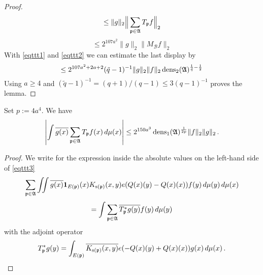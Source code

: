 {\begin{proof}
\begin{equation}
\end{equation}
 \begin{equation}
     \le \|g\|_2 \Big\| \sum_{\mathfrak p \in \mathfrak{A}} T_{\mathfrak p} f \Big\|_2
\end{equation}
 \begin{equation}
     \le 2^{107a^2}\|g\|_2 \|  M_{\mathcal{B}}f \|_2
\end{equation}
With \eqref{eqttt1} and
\eqref{eqttt2} we can estimate the last display by
\begin{equation}
    \le 2^{107a^2+2a+2}(\tilde{q}-1)^{-1} \|g\|_2 \|f\|_2\operatorname{\operatorname{dens}}_2(\mathfrak{A})^{\frac 1{\tilde{q}}-\frac 12}
\end{equation}
Using $a\ge 4$ and
$(\tilde q - 1)^{-1} = (q+1)/(q-1) \le 3(q-1)^{-1}$
proves the lemma.
\end{proof}


\begin{lemma}\label{lem decay n}
Set $p:=4a^4$. We have
    \begin{equation}\label{eqttt3}
  \left|\int \overline{g(x)} \sum_{\mathfrak p \in \mathfrak{A}} T_{\mathfrak p} f(x)\, d\mu(x)\right|\le
   2^{150a^3}\operatorname{\operatorname{dens}}_1(\mathfrak{A})^{\frac 1{2p}} \|f\|_2\|g\|_2\,.
\end{equation}
\end{lemma}



\begin{proof}

 We write for the expression inside the absolute values on the left-hand side of \eqref{eqttt3}
\begin{equation}
  \sum_{\mathfrak p \in \mathfrak{A}}\iint \overline{g(x)} \mathbf{1}_{E(\mathfrak p)}(x)
  {K_{\mathrm{s}(\mathfrak p)}(x,y)}e({Q}(x)(y) -
   {Q}(x)(x))
   f(y)\, d\mu(y)\,d\mu(x)
\end{equation}
\begin{equation}
  =\int \sum_{\mathfrak p \in \mathfrak{A}} \overline{T_{\mathfrak p} ^*g(y)}   f(y)\, d\mu(y)
\end{equation}
with the adjoint operator
\begin{equation}\label{eq tstarwritten}
    T_{\mathfrak p}^*g(y)=\int_{E(\mathfrak p)} \overline{K_{\mathrm{s}(\mathfrak p)}(x,y)}e(-{Q}(x)(y)+
    {Q}(x)(x))g(x)\, d\mu(x)\, .
\end{equation}






\end{proof}}
